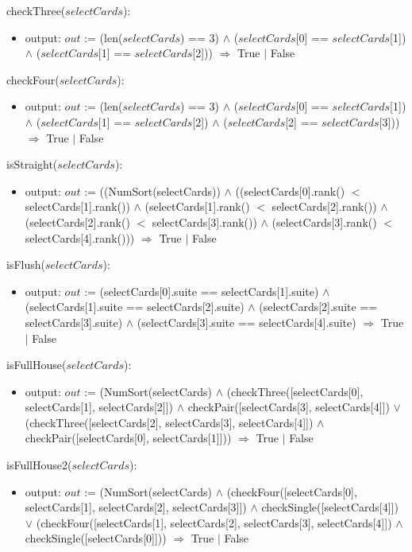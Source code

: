 \documentclass[12pt, titlepage]{article}
\begin{document}
checkThree($selectCards$):
\begin{itemize}
    \item output: $out$ := (len($selectCards$) == 3) $\land$ ($selectCards$[0] == $selectCards$[1]) $\land$ ($selectCards$[1] == $selectCards$[2])) $\Rightarrow$ True $\mid$ False
\end{itemize}

checkFour($selectCards$):
\begin{itemize}
    \item output: $out$ := (len($selectCards$) == 3) $\land$ ($selectCards$[0] == $selectCards$[1]) $\land$ ($selectCards$[1] == $selectCards$[2]) $\land$ ($selectCards$[2] == $selectCards$[3])) $\Rightarrow$ True $\mid$ False
\end{itemize}

isStraight($selectCards$):
\begin{itemize}
    \item output: $out$ := ((NumSort(selectCards)) $\land$ ((selectCards[0].rank() $<$ selectCards[1].rank()) $\land$ (selectCards[1].rank() $<$ selectCards[2].rank()) $\land$ (selectCards[2].rank() $<$ selectCards[3].rank()) $\land$ (selectCards[3].rank() $<$ selectCards[4].rank())) $\Rightarrow$ True $\mid$ False
\end{itemize}

isFlush($selectCards$):
\begin{itemize}
    \item output: $out$ := (selectCards[0].suite == selectCards[1].suite) $\land$ (selectCards[1].suite == selectCards[2].suite) $\land$ (selectCards[2].suite == selectCards[3].suite) $\land$ (selectCards[3].suite == selectCards[4].suite) $\Rightarrow$ True $\mid$ False
\end{itemize}

isFullHouse($selectCards$):
\begin{itemize}
    \item output: $out$ := (NumSort(selectCards) $\land$ (checkThree([selectCards[0], selectCards[1], selectCards[2]]) $\land$ checkPair([selectCards[3], selectCards[4]]) $\lor$ (checkThree([selectCards[2], selectCards[3], selectCards[4]]) $\land$ checkPair([selectCards[0], selectCards[1]])) $\Rightarrow$ True $\mid$ False
\end{itemize}

isFullHouse2($selectCards$):
\begin{itemize}
    \item output: $out$ := (NumSort(selectCards) $\land$ (checkFour([selectCards[0], selectCards[1], selectCards[2], selectCards[3]]) $\land$ checkSingle([selectCards[4]]) $\lor$ (checkFour([selectCards[1], selectCards[2], selectCards[3], selectCards[4]]) $\land$ checkSingle([selectCards[0]])) $\Rightarrow$ True $\mid$ False
\end{itemize}
\end{document}
